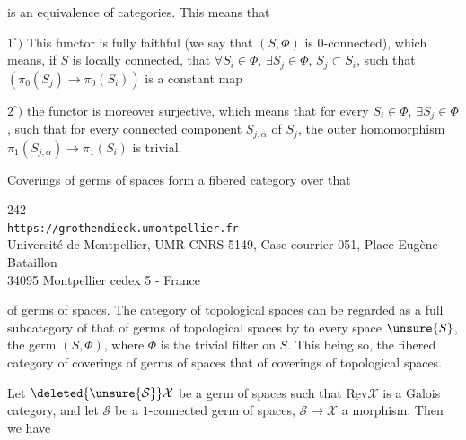 is an equivalence of categories. This means that

$1^\circ)$ This functor is fully faithful (we say that $(S,\Phi)$ is $0$-connected), which means, if $S$ is locally connected, that $\forall S_i\in\Phi$, $\exists S_j\in\Phi$, $S_j\subset S_i$, such that  $(\pi_0(S_j)\longrightarrow\pi_0(S_i))$ is a constant map


$2^\circ)$ the functor is moreover  surjective, which means that for every $S_i\in\Phi$, $\exists S_j\in\Phi$,  such that for every connected component $S_{j,\alpha}$ of $S_j$, the outer homomorphism $\pi_1(S_{j,\alpha})\longrightarrow\pi_1(S_i)$ is trivial.

Coverings of germs of spaces form a fibered category over that


\begin{center}
242\\
\texttt{https://grothendieck.umontpellier.fr}\\
Université de Montpellier, UMR CNRS 5149, Case courrier 051, Place Eugène Bataillon\\
34095 Montpellier cedex 5 - France
\end{center}


of germs of spaces. The category of topological spaces  can be regarded as a full subcategory of that of germs of topological spaces by  to every space $\unsure{S}$, the germ $(S,\Phi)$, where $\Phi$ is the trivial filter on $S$. This being so, the fibered category of coverings of germs of spaces  that of coverings of topological spaces.

Let $\deleted{\unsure{\mathcal S}}\mathcal X$ be a germ of spaces such that $\underline{\mathrm{Rev}}\mathcal X$ is a Galois category,  and let $\mathcal S$ be a $1$-connected germ of spaces, $\mathcal S\longrightarrow\mathcal X$ a morphism. Then we have


